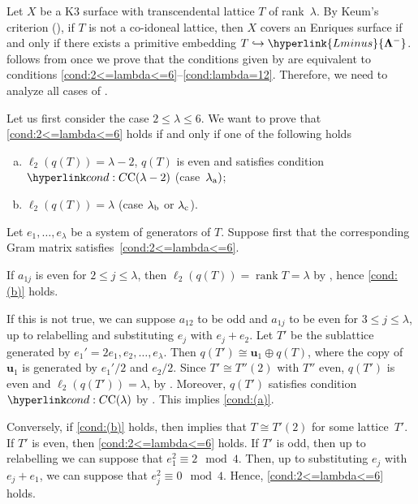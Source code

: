 \documentclass[a4paper]{amsart}
\theoremstyle{definition}
\theoremstyle{plain}
\DeclareMathOperator{\rank}{rank}
\newcommand{\bu}{\mathbf{u}}
\newcommand{\bLambda}{\mathbf{\Lambda}}
\newcommand{\Lminus}{\hyperlink{Lminus}{\bLambda^-}}
\begin{document}
Let \(X\) be a K3 surface with transcendental lattice \(T\) of rank~\(\lambda\).
By Keum's criterion (), if \(T\) is not a co-idoneal lattice, then \(X\) covers an Enriques surface if and only if there exists a primitive embedding \(T \hookrightarrow \Lminus\).
 follows from  once we prove that the conditions given by  are equivalent to conditions \ref{cond:2<=lambda<=6}--\ref{cond:lambda=12}.
Therefore, we need to analyze all cases of .

Let us first consider the case \(2 \leq \lambda \leq 6\). We want to prove that \ref{cond:2<=lambda<=6} holds if and only if one of the following holds
\begin{enumerate}[(a)]
 \item \label{cond:(a)} \(\ell_2(q(T)) = \lambda - 2\), \(q(T)\) is even and satisfies condition \(\condC{\lambda - 2}\) (case~\(\lambda_{\rm a})\);
 \item \label{cond:(b)} \(\ell_2(q(T)) = \lambda\) (case \(\lambda_{\rm b}\) or \(\lambda_{\rm c}\)).
\end{enumerate}

Let \(e_1,\ldots,e_ \lambda\) be a system of generators of \(T\).
Suppose first that the corresponding Gram matrix satisfies~\ref{cond:2<=lambda<=6}.

If \(a_{1j}\) is even for \(2 \leq j \leq \lambda\), then \(\ell_2(q(T)) = \rank T = \lambda\) by , hence \ref{cond:(b)} holds.

If this is not true, we can suppose \(a_{12}\) to be odd and \(a_{1j}\) to be even for \(3 \leq j \leq \lambda\), up to relabelling and substituting \(e_j\) with \(e_j + e_2\).
Let \(T'\) be the sublattice generated by \(e_1' = 2e_1,e_2,\ldots,e_ \lambda\).
Then \(q(T') \cong \bu_1 \oplus q(T)\), where the copy of \(\bu_1\) is generated by \(e_1'/2\) and \(e_2/2\).
Since \(T' \cong T''(2)\) with \(T''\) even, \(q(T')\) is even and \(\ell_2(q(T')) = \lambda\), by . 
Moreover, \(q(T')\) satisfies condition \(\condC{\lambda}\) by . 
This implies \ref{cond:(a)}.

Conversely, if \ref{cond:(b)} holds, then  implies that \(T \cong T'(2)\) for some lattice~\(T'\). 
If \(T'\) is even, then \ref{cond:2<=lambda<=6} holds.
If \(T'\) is odd, then up to relabelling we can suppose that \(e_1^2 \equiv 2 \mod 4\). Then, up to substituting \(e_j\) with \(e_j + e_1\), we can suppose that \(e_j^2 \equiv 0 \mod 4\). Hence, \ref{cond:2<=lambda<=6} holds.
\end{document}
